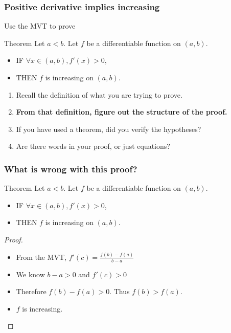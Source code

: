 \documentclass[14pt]{beamer}
\begin{document}
\begin{frame}[t]
	\frametitle{Positive derivative implies increasing}

	Use the MVT to prove

	\begin{block}{Theorem}
		Let $a < b$. Let $f$ be a differentiable function on $(a,b)$.
		\begin{itemize}
			\item IF $\forall x \in (a,b), f'(x) >0$,

			\item THEN $f$ is increasing on $(a,b)$.
		\end{itemize}
	\end{block}


	\begin{enumerate}
		\item Recall the definition of what you are trying to prove.

		\item {\bfseries From that definition, figure out the structure of the proof.}

		\item If you have used a theorem, did you verify the hypotheses?

		\item Are there words in your proof, or just equations?
	\end{enumerate}
\end{frame}

\begin{frame}[t]
	\frametitle{What is wrong with this proof?}

	\begin{block}{Theorem}
		Let $a < b$. Let $f$ be a differentiable function on $(a,b)$.
		\begin{itemize}
			\item IF $\forall x \in (a,b), f'(x) >0$,

			\item THEN $f$ is increasing on $(a,b)$.
		\end{itemize}
	\end{block}

	\begin{proof}
		\begin{itemize}
			\item From the MVT, $\displaystyle f'(c) = \frac{f(b) - f(a)}{b-a}$

			\item We know $\displaystyle b-a>0$ and $\displaystyle f'(c)>0$

			\item Therefore $\displaystyle f(b) - f(a)>0$. \quad Thus
				$\displaystyle f(b) > f(a)$.

			\item $f$ is increasing.
		\end{itemize}
	\end{proof}
\end{frame}
\end{document}

